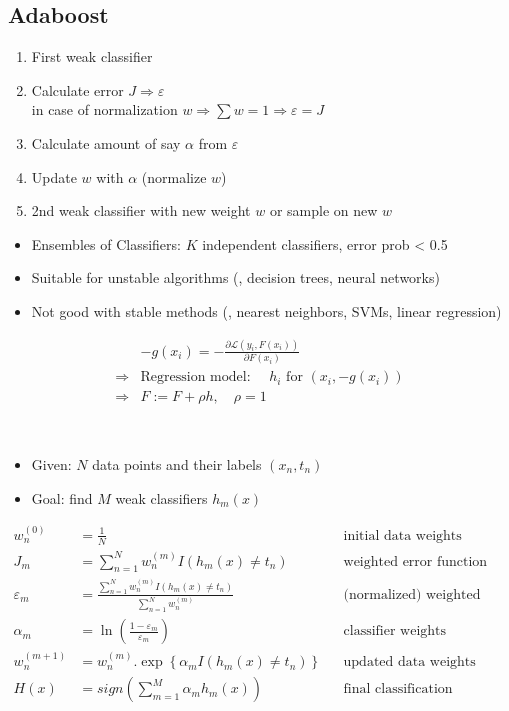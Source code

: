 \subsection{Adaboost}
\begin{enumerate}
	\item First weak classifier
	\item Calculate error $J \Rightarrow \varepsilon$\\
	in case of normalization $w \Rightarrow \sum w = 1 \Rightarrow \varepsilon = J$
	\item Calculate amount of say $\alpha$ from $\varepsilon$
	\item Update $w$ with $\alpha$ (normalize $w$)
	\item 2nd weak classifier with new weight $w$ or sample on new $w$
\end{enumerate}

\begin{itemize}
	\item Ensembles of Classifiers: $K$ independent classifiers, error \ac{prob} < 0.5
	\item Suitable for unstable algorithms (\ie, decision trees, neural networks)
	\item Not good with stable methods (\ie, nearest neighbors, \ac{SVM}s, linear regression)
\end{itemize}

\begin{align}
	& -g(x_i) = -\frac{\partial \mathcal{L} (y_i, F(x_i))}{\partial F(x_i)} \\
	\Rightarrow & \text{Regression model: } \quad h_i \text{ for } (x_i, -g(x_i))\\
	\Rightarrow & F:= F + \rho h, \quad \rho = 1
\end{align}

\\
 \begin{itemize}
	\item Given: $N$ data points and their labels $(x_n, t_n)$
	\item Goal: find $M$ weak classifiers $h_m(x)$
\end{itemize}
\begin{align}
	w_n^{(0)} &= \frac{1}{N} && \text{initial data weights}\\
	J_m &= \sum_{n=1}^{N} w_n^{(m)} I\left( h_m(x) \neq t_n \right) && \text{weighted error function}\\
	\varepsilon_m &= \frac{\sum_{n=1}^{N} w_n^{(m)} I\left( h_m(x) \neq t_n \right) }{\sum_{n=1}^{N} w_n^{(m)}} && \text{(normalized) weighted error}\\
	\alpha_m &= \ln \left(\frac{1-\varepsilon_m}{\varepsilon_m}\right) && \text{classifier weights}\\
	w_n^{(m+1)} &= w_n^{(m)}.\exp\left\{ \alpha_m I\left( h_m(x) \neq t_n \right)\right\} && \text{updated data weights}\\
	H(x) &= sign\left( \sum_{m=1}^{M} \alpha_m h_m(x) \right) && \text{final classification}
\end{align}

